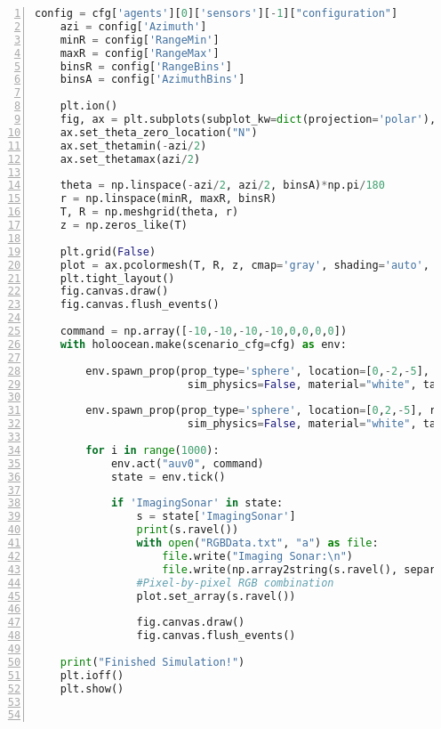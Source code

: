 \documentclass[]{article}
\begin{document}
\begin{lstlisting}[frame=single, numbers=left, language=Python]
	config = cfg['agents'][0]['sensors'][-1]["configuration"]
	azi = config['Azimuth']
	minR = config['RangeMin']
	maxR = config['RangeMax']
	binsR = config['RangeBins']
	binsA = config['AzimuthBins']
	
	plt.ion()
	fig, ax = plt.subplots(subplot_kw=dict(projection='polar'), figsize=(8,5))
	ax.set_theta_zero_location("N")
	ax.set_thetamin(-azi/2)
	ax.set_thetamax(azi/2)
	
	theta = np.linspace(-azi/2, azi/2, binsA)*np.pi/180
	r = np.linspace(minR, maxR, binsR)
	T, R = np.meshgrid(theta, r)
	z = np.zeros_like(T)
	
	plt.grid(False)
	plot = ax.pcolormesh(T, R, z, cmap='gray', shading='auto', vmin=0, vmax=1)
	plt.tight_layout()
	fig.canvas.draw()
	fig.canvas.flush_events()
	
	command = np.array([-10,-10,-10,-10,0,0,0,0])
	with holoocean.make(scenario_cfg=cfg) as env:
	
		env.spawn_prop(prop_type='sphere', location=[0,-2,-5], rotation=None, scale=1,
						sim_physics=False, material="white", tag="figure")
	
		env.spawn_prop(prop_type='sphere', location=[0,2,-5], rotation=None, scale=1,
						sim_physics=False, material="white", tag="figure")
	
		for i in range(1000):
			env.act("auv0", command)
			state = env.tick()
	
			if 'ImagingSonar' in state:
				s = state['ImagingSonar']
				print(s.ravel())
				with open("RGBData.txt", "a") as file:
					file.write("Imaging Sonar:\n")
					file.write(np.array2string(s.ravel(), separator=', ') + "\n\n")
				#Pixel-by-pixel RGB combination
				plot.set_array(s.ravel())
	
				fig.canvas.draw()
				fig.canvas.flush_events()
	
	print("Finished Simulation!")
	plt.ioff()
	plt.show()
	
	
\end{lstlisting}

\newpage
\end{document}
